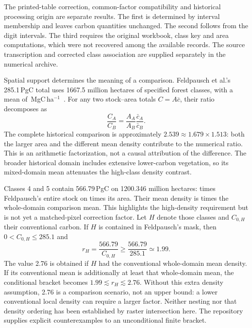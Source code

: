 \documentclass[11pt,a4paper]{article}
\theoremstyle{remark}
\begin{document}
The printed-table correction, common-factor compatibility and historical processing origin are separate results. The first is determined by interval membership and leaves carbon quantities unchanged. The second follows from the digit intervals. The third requires the original workbook, class key and area computations, which were not recovered among the available records. The source transcription and corrected class association are supplied separately in the numerical archive.

Spatial support determines the meaning of a comparison. Feldpausch et al.'s 285.1\,PgC total uses 1667.5 million hectares of specified forest classes, with a mean of \FeldDensity{}\,MgC\,ha$^{-1}$\ \citep{Feldpausch2012}. For any two stock--area totals $C=A\bar c$, their ratio decomposes as
\begin{equation}
\frac{C_A}{C_B}=\frac{A_A}{A_B}\frac{\bar c_A}{\bar c_B}.
\label{eq:supportfactor}
\end{equation}
The complete historical comparison is approximately $2.539\approx1.679\times1.513$: both the larger area and the different mean density contribute to the numerical ratio. This is an arithmetic factorization, not a causal attribution of the difference. The broader historical domain includes extensive lower-carbon vegetation, so its mixed-domain mean attenuates the high-class density contrast.

Classes 4 and 5 contain 566.79\,PgC on 1200.346 million hectares: \HighStockRatio{} times Feldpausch's entire stock on \HighAreaRatio{} times its area. Their mean density is \HighDensityRatio{} times the whole-domain comparison mean. This highlights the high-density requirement but is not yet a matched-pixel correction factor. Let $H$ denote those classes and $C_{0,H}$ their conventional carbon. If $H$ is contained in Feldpausch's mask, then $0<C_{0,H}\leq285.1$ and
\begin{equation}
 r_H=\frac{566.79}{C_{0,H}}\geq\frac{566.79}{285.1}\simeq1.99.
 \label{eq:subsetbound}
\end{equation}
The value 2.76 is obtained if $H$ had the conventional whole-domain mean density. If its conventional mean is additionally at least that whole-domain mean, the conditional bracket becomes $1.99\lesssim r_H\lesssim2.76$. Without this extra density assumption, 2.76 is a comparison scenario, not an upper bound: a lower conventional local density can require a larger factor. Neither nesting nor that density ordering has been established by raster intersection here. The repository supplies explicit counterexamples to an unconditional finite bracket.
\end{document}
